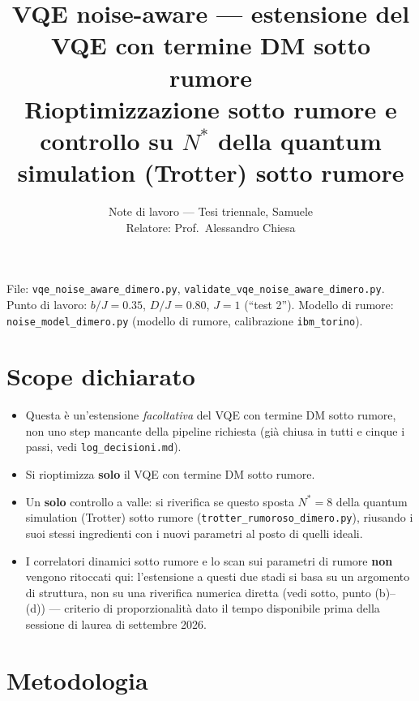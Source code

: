 \documentclass[11pt,a4paper]{article}
\title{\vspace{-1.5em}\color{inkblue}VQE noise-aware --- estensione del VQE con termine DM sotto rumore\\[0.2em]
\Large\normalfont\color{softgray}Rioptimizzazione sotto rumore e controllo su $N^*$ della quantum simulation (Trotter) sotto rumore}
\author{Note di lavoro --- Tesi triennale, Samuele\\ Relatore: Prof.\ Alessandro Chiesa}
\date{}
\begin{document}
\sloppy
\maketitle
\thispagestyle{fancy}
\vspace{-2.2em}

File: \texttt{vqe\_noise\_aware\_dimero.py}, \texttt{validate\_vqe\_noise\_aware\_dimero.py}.
Punto di lavoro: $b/J=0.35$, $D/J=0.80$, $J=1$ (``test 2''). Modello di
rumore: \texttt{noise\_model\_dimero.py} (modello di rumore, calibrazione
\texttt{ibm\_torino}).

\section*{Scope dichiarato}

\begin{itemize}[leftmargin=1.3em,itemsep=0.3em]
\item Questa è un'estensione \emph{facoltativa} del VQE con termine DM sotto rumore,
non uno step mancante della pipeline richiesta (già chiusa in tutti e
cinque i passi, vedi \texttt{log\_decisioni.md}).
\item Si rioptimizza \textbf{solo} il VQE con termine DM sotto rumore.
\item Un \textbf{solo} controllo a valle: si riverifica se questo sposta
$N^*=8$ della quantum simulation (Trotter) sotto rumore
(\texttt{trotter\_rumoroso\_dimero.py}), riusando i
suoi stessi ingredienti con i nuovi parametri al posto di quelli ideali.
\item I correlatori dinamici sotto rumore e lo scan sui parametri di
rumore \textbf{non} vengono ritoccati qui: l'estensione a questi due
stadi si basa su un argomento di struttura, non su una
riverifica numerica diretta (vedi sotto, punto (b)--(d)) --- criterio di
proporzionalità dato il tempo disponibile prima della sessione di laurea
di settembre 2026.
\end{itemize}

\section*{Metodologia}
\end{document}
